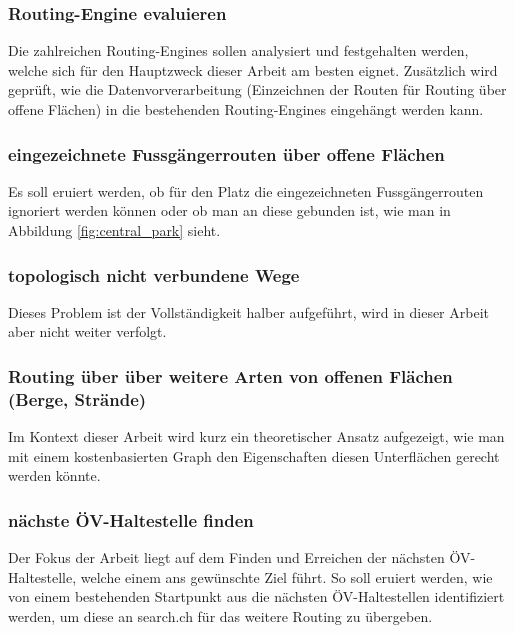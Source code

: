 \subsubsection{Routing-Engine evaluieren}
\label{target:Routing-Enginge evaluieren}
Die zahlreichen Routing-Engines sollen analysiert und festgehalten werden, welche sich für den Hauptzweck dieser Arbeit am besten eignet. Zusätzlich wird geprüft, wie die Datenvorverarbeitung (Einzeichnen der Routen für Routing über offene Flächen) in die bestehenden Routing-Engines eingehängt werden kann. 

\subsubsection{eingezeichnete Fussgängerrouten über offene Flächen}
\label{target:eingezeichnete Fussgängerrouten über offene Flächen}
Es soll eruiert werden, ob für den Platz die eingezeichneten Fussgängerrouten ignoriert werden können oder ob man an diese gebunden ist, wie man in Abbildung \ref{fig:central_park} sieht.

\subsubsection{topologisch nicht verbundene Wege}
\label{target:topologisch nicht verbundene Wege}
Dieses Problem ist der Vollständigkeit halber aufgeführt, wird in dieser Arbeit aber nicht weiter verfolgt.

\subsubsection{Routing über über weitere Arten von offenen Flächen (Berge, Strände)}
\label{target:Routing über über weitere Arten von offenen Flächen (Berge, Strände)}
Im Kontext dieser Arbeit wird kurz ein theoretischer Ansatz aufgezeigt, wie man mit einem kostenbasierten Graph den Eigenschaften diesen Unterflächen gerecht werden könnte.

\subsubsection{nächste ÖV-Haltestelle finden}
\label{target:nächste ÖV-Haltestelle finden}
Der Fokus der Arbeit liegt auf dem Finden und Erreichen der nächsten ÖV-Haltestelle, welche einem ans gewünschte Ziel führt. So soll eruiert werden, wie von einem bestehenden Startpunkt aus die nächsten ÖV-Haltestellen identifiziert werden, um diese an search.ch für das weitere Routing zu übergeben.

